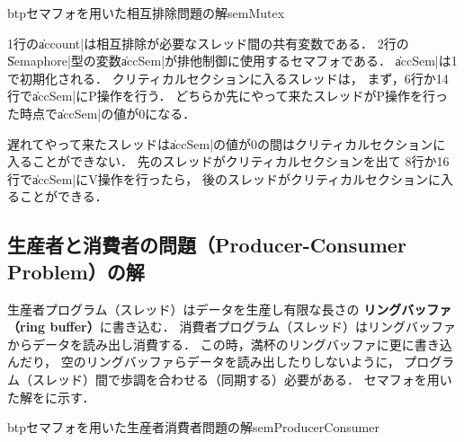 \begin{myfig}{btp}{セマフォを用いた相互排除問題の解}{semMutex}

\end{myfig}

1行の\|account|は相互排除が必要なスレッド間の共有変数である．
2行の\|Semaphore|型の変数\|accSem|が排他制御に使用するセマフォである．
\|accSem|は1で初期化される．
クリティカルセクションに入るスレッドは，
まず，6行か14行で\|accSem|にP操作を行う．
どちらか先にやって来たスレッドがP操作を行った時点で\|accSem|の値が0になる．

遅れてやって来たスレッドは\|accSem|の値が0の間はクリティカルセクションに
入ることができない．
先のスレッドがクリティカルセクションを出て
8行か16行で\|accSem|にV操作を行ったら，
後のスレッドがクリティカルセクションに入ることができる．

\subsection{生産者と消費者の問題（Producer-Consumer Problem）の解}
生産者プログラム（スレッド）はデータを生産し有限な長さの
{\bf リングバッファ（ring buffer）}に書き込む．
消費者プログラム（スレッド）はリングバッファからデータを読み出し消費する．
この時，満杯のリングバッファに更に書き込んだり，
空のリングバッファらデータを読み出したりしないように，
プログラム（スレッド）間で歩調を合わせる（同期する）必要がある．
セマフォを用いた解をに示す．

\begin{myfig}{btp}{セマフォを用いた生産者消費者問題の解}{semProducerConsumer}

\end{myfig}

